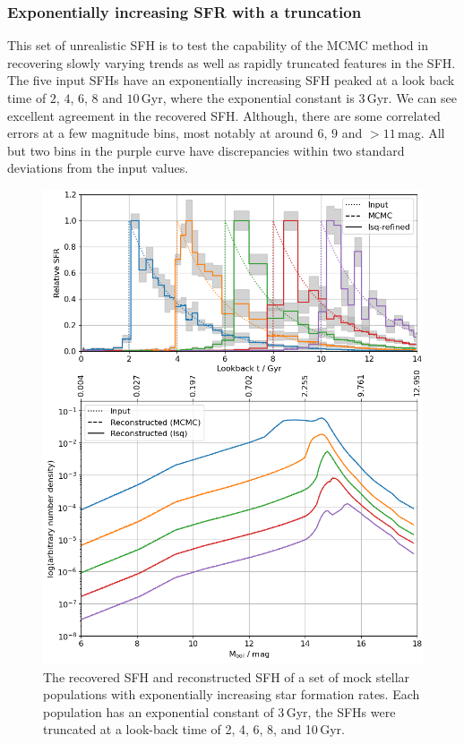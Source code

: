 \documentclass[fleqn,usenatbib]{mnras}
\begin{document}
\subsubsection*{Exponentially increasing SFR with a truncation}
This set of unrealistic SFH is to test the capability of the MCMC method in
recovering slowly varying trends as well as rapidly truncated features in the SFH.
The five input SFHs have an exponentially increasing SFH peaked at a look back
time of $2$, $4$, $6$, $8$ and $10$\,Gyr, where the exponential constant is
$3$\,Gyr. We can see excellent agreement in the recovered SFH. Although, there
are some correlated errors at a few magnitude bins, most notably at around $6$,
$9$ and $>11$\,mag. All but two bins in the purple curve have discrepancies
within two standard deviations from the input values. 

\begin{figure}
  \includegraphics[width=\columnwidth]{figures/fig_01_exponential_decay_wdlf.png}
  \caption{The recovered SFH and reconstructed SFH of a set of mock stellar
  populations with exponentially increasing star formation rates. Each
  population has an exponential constant of 3\,Gyr, the SFHs were truncated at
  a look-back time of 2, 4, 6, 8, and 10\,Gyr.}
  \label{fig:exponential_sfh}
\end{figure}
\end{document}
